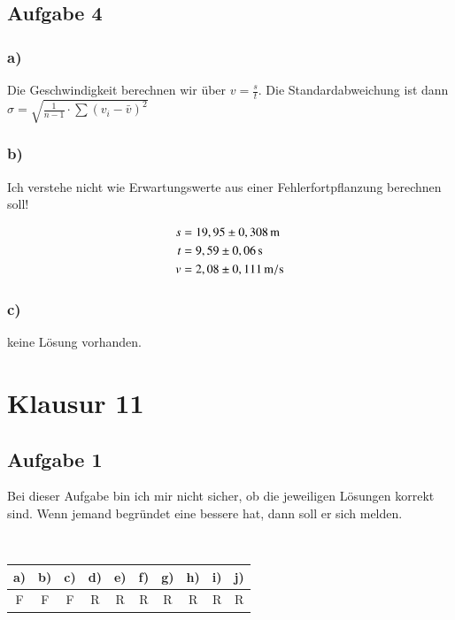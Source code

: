 \newpage

\subsection{Aufgabe 4}

\subsubsection*{a)}


Die Geschwindigkeit berechnen wir über $v = \frac{s}{t}$. Die Standardabweichung ist dann $\sigma = \sqrt{\frac{1}{n-1} \cdot \sum \left( v_i - \bar{v} \right)^2}$


\subsubsection*{b)}

Ich verstehe nicht wie Erwartungswerte aus einer Fehlerfortpflanzung berechnen soll!

\begin{align*}
s &= \unit[19,95 \pm 0,308]{m} \\
t &= \unit[9,59 \pm 0,06]{s} \\
v &= \unit[2,08 \pm 0,111]{m/s}
\end{align*}


\subsubsection*{c)}

keine Lösung vorhanden.



\section{Klausur 11}

\subsection{Aufgabe 1}

Bei dieser Aufgabe bin ich mir nicht sicher, ob die jeweiligen Lösungen korrekt sind. Wenn jemand begründet eine bessere hat, dann soll er sich melden.

\hfill\\

\begin{center}
\begin{tabular}{c|c|c|c|c|c|c|c|c|c}
a) & b) & c) & d) & e) & f) & g) & h) & i) & j) \\ 
\hline 
F & F & F & R & R & R & R & R & R & R \\ 
\end{tabular} 
\end{center}


